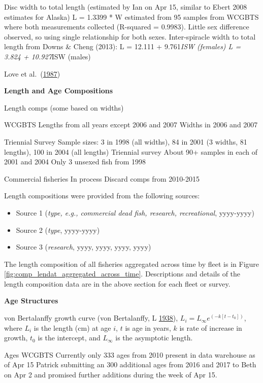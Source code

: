 \documentclass[12pt,]{article}
\begin{document}
Disc width to total length (estimated by Ian on Apr 15, similar to Ebert
2008 estimates for Alaska) L = 1.3399 * W estimated from 95 samples from
WCGBTS where both measurements collected (R-squared = 0.9983). Little
sex difference observed, so using single relationship for both sexes.
Inter-spiracle width to total length from Downs \& Cheng (2013): L =
12.111 + 9.761\emph{ISW (females) L = 3.824 + 10.927}ISW (males)

Love et al.~(\protect\hyperlink{ref-Love1987}{1987})

\textbf{Length and Age Compositions}

Length comps (some based on widths)

WCGBTS Lengths from all years except 2006 and 2007 Widths in 2006 and
2007

Triennial Survey Sample sizes: 3 in 1998 (all widths), 84 in 2001 (3
widths, 81 lengths), 100 in 2004 (all lengths) Triennial survey About
90+ samples in each of 2001 and 2004 Only 3 unsexed fish from 1998

Commercial fisheries In process Discard comps from 2010-2015

Length compositions were provided from the following sources:

\begin{itemize}[noitemsep,nolistsep,topsep=0pt]
  \item Source 1 (\emph{type, e.g., commercial dead fish, research, recreational}, yyyy-yyyy)    
  \item Source 2 (\emph{type}, yyyy-yyyy)    
  \item Source 3 (\emph{research}, yyyy, yyyy, yyyy, yyyy) 
\end{itemize}

The length composition of all fisheries aggregated across time by fleet
is in Figure \ref{fig:comp_lendat_aggregated_across_time}. Descriptions
and details of the length composition data are in the above section for
each fleet or survey.

\vspace{.5cm}

\textbf{Age Structures}

von Bertalanffy growth curve (von Bertalanffy, L
\protect\hyperlink{ref-vonBertalanffy1938}{1938}),
\(L_i = L_{\infty}e^{(-k[t-t_0])}\), where \(L_i\) is the length (cm) at
age \(i\), \(t\) is age in years, \(k\) is rate of increase in growth,
\(t_0\) is the intercept, and \(L_{\infty}\) is the asymptotic length.

Ages WCGBTS Currently only 333 ages from 2010 present in data warehouse
as of Apr 15 Patrick submitting an 300 additional ages from 2016 and
2017 to Beth on Apr 2 and promised further additions during the week of
Apr 15.
\end{document}
